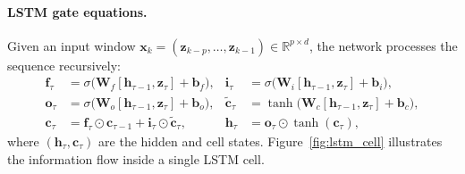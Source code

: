 \documentclass{report}
\theoremstyle{plain}
\theoremstyle{remark}
\numberwithin{equation}{section}              %
\begin{document}
\paragraph{LSTM gate equations.}
Given an input window
$\mathbf{x}_k = (\mathbf{z}_{k-p},\ldots,\mathbf{z}_{k-1})
\in\mathbb{R}^{p\times d}$,
the network processes the sequence recursively:
\begin{align}
\mathbf{f}_\tau &= \sigma\!\bigl(\mathbf{W}_f[\mathbf{h}_{\tau-1},\mathbf{z}_\tau]+\mathbf{b}_f\bigr), &
\mathbf{i}_\tau &= \sigma\!\bigl(\mathbf{W}_i[\mathbf{h}_{\tau-1},\mathbf{z}_\tau]+\mathbf{b}_i\bigr), \nonumber\\
\mathbf{o}_\tau &= \sigma\!\bigl(\mathbf{W}_o[\mathbf{h}_{\tau-1},\mathbf{z}_\tau]+\mathbf{b}_o\bigr), &
\tilde{\mathbf{c}}_\tau &= \tanh\!\bigl(\mathbf{W}_c[\mathbf{h}_{\tau-1},\mathbf{z}_\tau]+\mathbf{b}_c\bigr), \nonumber\\
\mathbf{c}_\tau &= \mathbf{f}_\tau \odot \mathbf{c}_{\tau-1} + \mathbf{i}_\tau \odot \tilde{\mathbf{c}}_\tau, &
\mathbf{h}_\tau &= \mathbf{o}_\tau \odot \tanh(\mathbf{c}_\tau),
\label{eq:lstm_gates}
\end{align}
where $(\mathbf{h}_\tau,\mathbf{c}_\tau)$ are the hidden and cell states.
Figure~\ref{fig:lstm_cell} illustrates the information flow inside a single
LSTM cell.
\end{document}
